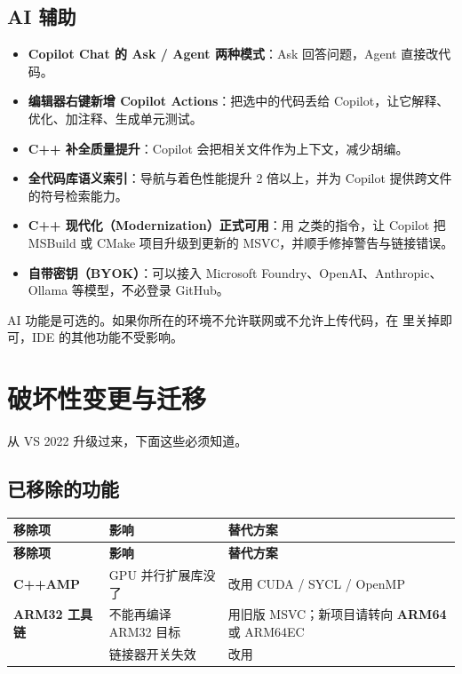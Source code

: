 \subsection{AI 辅助}
\begin{itemize}
  \item \textbf{Copilot Chat 的 Ask / Agent 两种模式}：Ask 回答问题，Agent 直接改代码。
  \item \textbf{编辑器右键新增 Copilot Actions}：把选中的代码丢给 Copilot，让它解释、优化、加注释、生成单元测试。
  \item \textbf{C++ 补全质量提升}：Copilot 会把相关文件作为上下文，减少胡编。
  \item \textbf{全代码库语义索引}：导航与着色性能提升 2 倍以上，并为 Copilot 提供跨文件的符号检索能力。
  \item \textbf{C++ 现代化（Modernization）正式可用}：用  之类的指令，让 Copilot 把 MSBuild 或 CMake 项目升级到更新的 MSVC，并顺手修掉警告与链接错误。
  \item \textbf{自带密钥（BYOK）}：可以接入 Microsoft Foundry、OpenAI、Anthropic、Ollama 等模型，不必登录 GitHub。
\end{itemize}

\begin{tipbox}[提示]
AI 功能是可选的。如果你所在的环境不允许联网或不允许上传代码，在  里关掉即可，IDE 的其他功能不受影响。
\end{tipbox}

\section{破坏性变更与迁移}
从 VS 2022 升级过来，下面这些必须知道。

\subsection{已移除的功能}
\begin{longtable}{L{4.2cm}L{4.6cm}L{5.8cm}}
\toprule
\textbf{移除项} & \textbf{影响} & \textbf{替代方案} \\
\midrule
\endfirsthead
\toprule
\textbf{移除项} & \textbf{影响} & \textbf{替代方案} \\
\midrule
\endhead
\bottomrule
\endlastfoot
\textbf{C++AMP} & GPU 并行扩展库没了 & 改用 CUDA / SYCL / OpenMP \\
\textbf{ARM32 工具链} & 不能再编译 ARM32 目标 & 用旧版 MSVC；新项目请转向 \textbf{ARM64} 或 ARM64EC \\
 & 链接器开关失效 & 改用 \textbf{} \\
\end{longtable}

